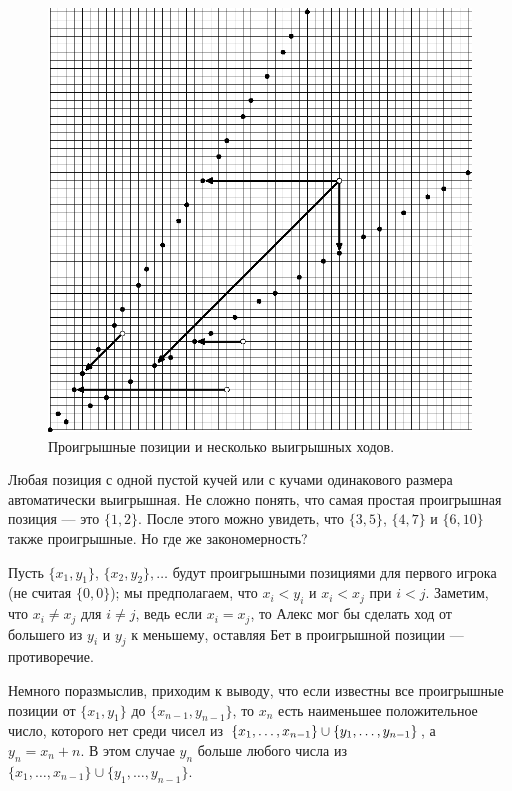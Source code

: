 \begin{figure}[!b]
\vskip-0mm
\centering
\includegraphics{mppics/pic-5}
\vskip-0mm
\caption{Проигрышные позиции и несколько выигрышных ходов.}
\label{pic:nim}
\end{figure}

Любая позиция с одной пустой кучей или с кучами одинакового размера автоматически выигрышная.
Не сложно понять, что самая простая проигрышная позиция --- это $\{1, 2\}$.
После этого можно увидеть, что $\{3, 5\}$, $\{4, 7\}$ и $\{6, 10\}$ также проигрышные.
Но где же закономерность?

Пусть $\{x_1 , y_1\}$, $\{x_2 , y_2\},\dots$ будут проигрышными позициями для первого игрока (не считая $\{0, 0\}$);
мы предполагаем, что $x_i < y_i$ и $x_i < x_j$ при $i < j$.
Заметим, что $x_i \ne x_j$ для $i \ne j$, ведь если $x_i = x_j$, то Алекс мог бы сделать ход от большего из $y_i$ и $y_j$ к меньшему, оставляя Бет в проигрышной позиции --- противоречие.

Немного поразмыслив, приходим к выводу, что если известны все проигрышные позиции от $\{x_1 , y_1\}$ до $\{x_{n-1}, y_{n-1}\}$, то $x_n$ есть наименьшее положительное число, которого нет среди чисел из $\{x_1, \dots , x_{n-1}\} \z\cup \{y_1, \dots , y_{n-1}\}$, а $y_n = x_n + n$.
В этом случае $y_n$ больше любого числа из $\{x_1, \dots , x_{n-1}\} \cup \{y_1, \dots , y_{n-1}\}$.

